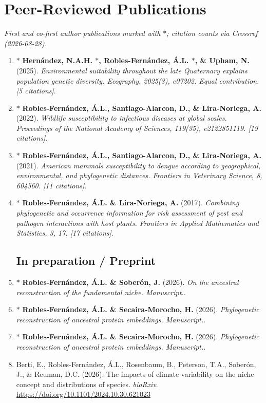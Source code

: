 \documentclass[11pt,a4paper]{article}
\newcommand{\firstpub}[3]{\item $\ast$ \textbf{#1} (#2). \textit{#3}.}
\begin{document}
\section*{Peer-Reviewed Publications}

\textit{First and co-first author publications marked with $\ast$; citation counts via Crossref (2026-08-28).}

\begin{enumerate}[leftmargin=0pt]
\firstpub{Hernández, N.A.H. $\ast$, Robles-Fernández, Á.L. $\ast$, \& Upham, N.}{2025}{Environmental suitability throughout the late Quaternary explains population genetic diversity. \textit{Ecography}, 2025(3), e07202. \textit{Equal contribution. [5 citations]}}

\firstpub{Robles-Fernández, Á.L., Santiago-Alarcon, D., \& Lira-Noriega, A.}{2022}{Wildlife susceptibility to infectious diseases at global scales. \textit{Proceedings of the National Academy of Sciences}, 119(35), e2122851119. [19 citations]}

\firstpub{Robles-Fernández, Á.L., Santiago-Alarcon, D., \& Lira-Noriega, A.}{2021}{American mammals susceptibility to dengue according to geographical, environmental, and phylogenetic distances. \textit{Frontiers in Veterinary Science}, 8, 604560. [11 citations]}

\firstpub{Robles-Fernández, Á.L. \& Lira-Noriega, A.}{2017}{Combining phylogenetic and occurrence information for risk assessment of pest and pathogen interactions with host plants. \textit{Frontiers in Applied Mathematics and Statistics}, 3, 17. [17 citations]}

\subsection*{In preparation / Preprint}

\firstpub{Robles-Fernández, Á.L. \& Soberón, J.}{2026}{On the ancestral reconstruction of the fundamental niche. \textit{Manuscript}.}

\firstpub{Robles-Fernández, Á.L. \& Secaira-Morocho, H.}{2026}{Phylogenetic reconstruction of ancestral protein embeddings. \textit{Manuscript}.}

\firstpub{Robles-Fernández, Á.L. \& Secaira-Morocho, H.}{2026}{Phylogenetic reconstruction of ancestral protein embeddings. \textit{Manuscript}.}

\item Berti, E., Robles-Fernández, Á.L., Rosenbaum, B., Peterson, T.A., Soberón, J., \& Reuman, D.C. (2026). The impacts of climate variability on the niche concept and distributions of species. \textit{bioRxiv}. \url{https://doi.org/10.1101/2024.10.30.621023} 
\end{enumerate}
\end{document}

